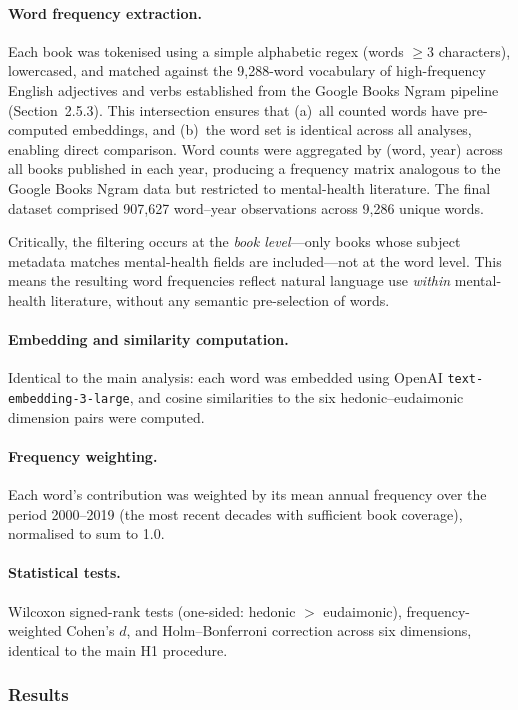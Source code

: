 \documentclass[12pt,a4paper]{article}
\begin{document}
\paragraph{Word frequency extraction.}
Each book was tokenised using a simple alphabetic regex (words $\geq 3$ characters), lowercased, and matched against the 9{,}288-word vocabulary of high-frequency English adjectives and verbs established from the Google Books Ngram pipeline (Section~2.5.3).
This intersection ensures that (a)~all counted words have pre-computed embeddings, and (b)~the word set is identical across all analyses, enabling direct comparison.
Word counts were aggregated by (word, year) across all books published in each year, producing a frequency matrix analogous to the Google Books Ngram data but restricted to mental-health literature.
The final dataset comprised 907{,}627 word--year observations across 9{,}286 unique words.

Critically, the filtering occurs at the \textit{book level}---only books whose subject metadata matches mental-health fields are included---not at the word level.
This means the resulting word frequencies reflect natural language use \textit{within} mental-health literature, without any semantic pre-selection of words.

\paragraph{Embedding and similarity computation.}
Identical to the main analysis: each word was embedded using OpenAI \texttt{text-embedding-3-large}, and cosine similarities to the six hedonic--eudaimonic dimension pairs were computed.

\paragraph{Frequency weighting.}
Each word's contribution was weighted by its mean annual frequency over the period 2000--2019 (the most recent decades with sufficient book coverage), normalised to sum to 1.0.

\paragraph{Statistical tests.}
Wilcoxon signed-rank tests (one-sided: hedonic $>$ eudaimonic), frequency-weighted Cohen's $d$, and Holm--Bonferroni correction across six dimensions, identical to the main H1 procedure.

\subsubsection*{Results}
\end{document}
